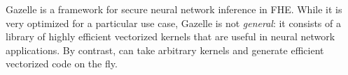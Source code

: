 %


Gazelle \cite{Gazelle} is a framework for secure neural network inference in FHE.
While it is very optimized for a particular use case, Gazelle is not {\em general}: it consists of a library of highly efficient vectorized kernels that are useful in neural network applications.
By contrast, \system can take arbitrary kernels and generate efficient vectorized code on the fly. %

